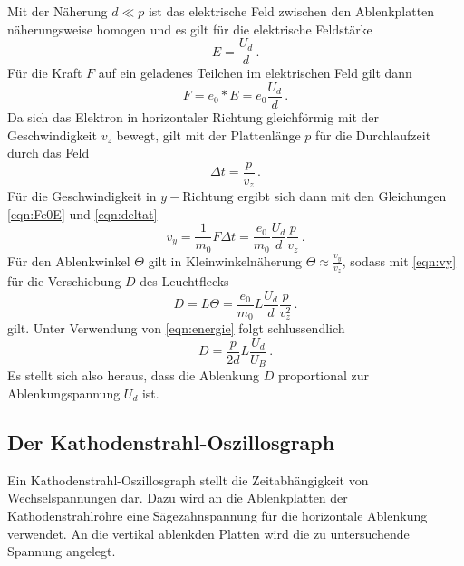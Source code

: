 Mit der Näherung $d \ll p$ ist das elektrische Feld zwischen den Ablenkplatten näherungsweise
homogen und es gilt für die elektrische Feldstärke
\begin{equation}
  E = \frac{U_d}{d}\,.
  \label{eqn:EUd}
\end{equation}
Für die Kraft $F$ auf ein geladenes Teilchen im elektrischen Feld gilt dann
\begin{equation}
  F = e_0 * E = e_0 \frac{U_d}{d}\,.
  \label{eqn:Fe0E}
\end{equation}
Da sich das Elektron in horizontaler Richtung gleichförmig mit der Geschwindigkeit
$v_z$ bewegt, gilt mit der Plattenlänge $p$ für die Durchlaufzeit durch das Feld
\begin{equation}
  \Delta t = \frac{p}{v_z}\,.
  \label{eqn:deltat}
\end{equation}
Für die Geschwindigkeit in $y-\text{Richtung}$ ergibt sich dann mit den Gleichungen
\eqref{eqn:Fe0E} und \eqref{eqn:deltat}
\begin{equation}
  v_y = \frac{1}{m_0} F \Delta t = \frac{e_0}{m_0}\frac{U_d}{d}\frac{p}{v_z}\,.
  \label{eqn:vy}
\end{equation}
Für den Ablenkwinkel $\Theta$ gilt in Kleinwinkelnäherung $\Theta \approx \frac{v_y}{v_z}$, sodass
mit \eqref{eqn:vy} für die Verschiebung $D$ des Leuchtflecks
\begin{equation}
  D = L \Theta = \frac{e_0}{m_0} L \frac{U_d}{d}\frac{p}{v_z^2}\,.
\end{equation}
gilt. Unter Verwendung von \eqref{eqn:energie} folgt schlussendlich
\begin{equation}
  D = \frac{p}{2d} L \frac{U_d}{U_B}\,.
\end{equation}
Es stellt sich also heraus, dass die Ablenkung $D$ proportional zur Ablenkungspannung
$U_d$ ist.
\subsection{Der Kathodenstrahl-Oszillosgraph}
\label{subsec:oszi}
Ein Kathodenstrahl-Oszillosgraph stellt die Zeitabhängigkeit von Wechselspannungen dar.
Dazu wird an die Ablenkplatten der Kathodenstrahlröhre eine Sägezahnspannung für die
horizontale Ablenkung verwendet. An die vertikal ablenkden Platten wird die zu untersuchende
Spannung angelegt.
